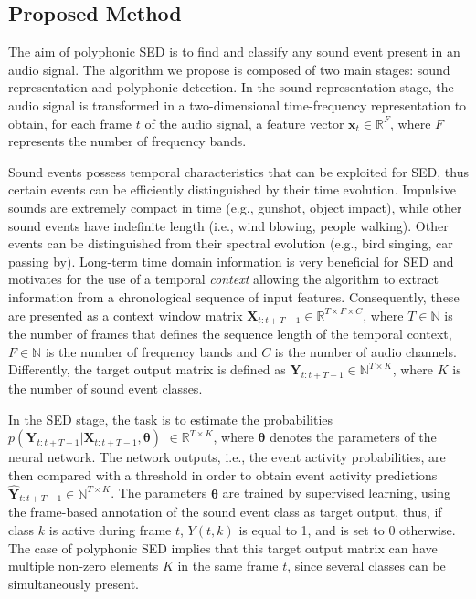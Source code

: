 \subsection{Proposed Method}

The aim of polyphonic SED is to find and classify any sound event present in an audio signal. The algorithm we propose is composed of two main stages: sound representation and polyphonic detection. In the sound representation stage, the audio signal is transformed in a two-dimensional time-frequency representation to obtain, for each frame $t$ of the audio signal, a feature vector $\mathbf{x}_t \in \mathbb{R}^F$, where $F$ represents the number of frequency bands. 

Sound events possess temporal characteristics that can be exploited for SED, thus certain events can be efficiently distinguished by their time evolution. Impulsive sounds are extremely compact in time (e.g., gunshot, object impact), while other sound events have indefinite length (i.e., wind blowing, people walking). Other events can be distinguished from their spectral evolution (e.g., bird singing, car passing by). Long-term time domain information is very beneficial for SED and motivates for the use of a temporal \textit{context} allowing the algorithm to extract information from a chronological sequence of input features. Consequently, these are presented as a context window matrix $\mathbf{X}_{t:t+T-1} \in \mathbb{R}^{T \times F \times C}$, where $T\in \mathbb{N}$ is the number of frames that defines the sequence length of the temporal context, $F\in \mathbb{N}$ is the number of frequency bands and $C$ is the number of audio channels. Differently, the target output matrix is defined as $\mathbf{Y}_{t:t+T-1} \in \mathbb{N}^{T \times K}$, where $K$ is the number of sound event classes.

In the SED stage, the task is to estimate the probabilities $p(\mathbf{Y}_{t:t+T-1}| \mathbf{X}_{t:t+T-1},  \boldsymbol{\theta})$ $\in \mathbb{R}^{T \times K}$, %
where $ \boldsymbol{\theta}$ denotes the parameters of the neural network.
The network outputs, i.e., the event activity probabilities, are then compared with a threshold in order to obtain event activity predictions $\mathbf{\hat{Y}}_{t:t+T-1}  \in \mathbb{N}^{T \times K}$.
The parameters $ \boldsymbol{\theta}$  are trained by supervised learning, using the frame-based annotation of the sound event class as target output, thus, if class $k$ is active during frame $t$, $Y(t,k)$ is equal to 1, and is set to 0 otherwise. The case of polyphonic SED implies that this target output matrix can have multiple non-zero elements $K$ in the same frame $t$, since several classes can be simultaneously present. 

